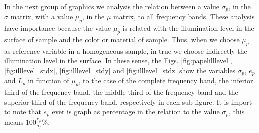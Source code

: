 \documentclass[review]{elsarticle}
\begin{document}
In the next group of graphics we analysis the relation between a value $\sigma_p$,
in the $\sigma$ matrix, with a value $\mu_p$, in the $\mu$ matrix, to all
frequency bands. 
These analysis have importance because  the value $\mu_p$
is related with the illumination level in the surface of sample \cite{Nothdurft:05}
and the color or material of sample. Thus, when we choose $\mu_p$  as reference variable
in a homogeneous sample,  
in true we choose indirectly the illumination level in the surface.
In these sense, the Figs. \ref{fig:papelilllevel}, \ref{fig:illlevel_stdx}, \ref{fig:illlevel_stdy}
and \ref{fig:illlevel_stdz} show the variables $\sigma_p$, $e_p$ and $L_p$ in function
of  $\mu_p$, to the case of the complete frequency band, the inferior third of the frequency band,
the middle third of the frequency band and the superior third of the frequency band,
respectively in each sub figure. It is import to note that $e_p$ ever is graph as percentage
in the relation to the value $\sigma_p$, this means  $100 \frac{e_p}{\sigma_p} \%$.
\end{document}
